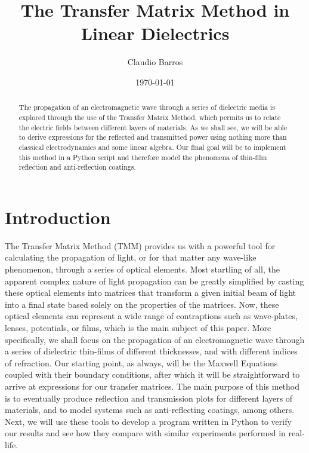 \documentclass[preprint, onecolumn, amsmath, amssymb, aps]{revtex4-1}
\numberwithin{equation}{section}
\begin{document}
	
\title{The Transfer Matrix Method in Linear Dielectrics} 
	
\author{Claudio Barros}
	
	
\date{\today}

\renewcommand{\abstractname}{\vspace{0\baselineskip}}
	
\begin{abstract}

The propagation of an electromagnetic wave through a series of dielectric media is explored through the use of the Transfer Matrix Method, which permits us to relate the electric fields between different layers of materials. As we shall see, we will be able to derive expressions for the reflected and transmitted power using nothing more than classical electrodynamics and some linear algebra. Our final goal will be to implement this method in a Python script and therefore model the phenomena of thin-film reflection and anti-reflection coatings.  

\end{abstract}
	
\maketitle
	
\section{Introduction}

The Transfer Matrix Method (TMM) provides us with a powerful tool for calculating the propagation of light, or for that matter any wave-like phenomenon, through a series of optical elements. Most startling of all, the apparent complex nature of light propagation can be greatly simplified by casting these optical elements into matrices that transform a given initial beam of light into a final state based solely on the properties of the matrices. Now, these optical elements can represent a wide range of contraptions such as wave-plates, lenses, potentials, or films, which is the main subject of this paper. More specifically, we shall focus on the propagation of an electromagnetic wave through a series of dielectric thin-films of different thicknesses, and with different indices of refraction. Our starting point, as always, will be the Maxwell Equations coupled with their boundary conditions, after which it will be straightforward to arrive at expressions for our transfer matrices. The main purpose of this method is to eventually produce reflection and transmission plots for different layers of materials, and to model systems such as anti-reflecting coatings, among others. Next, we will use these tools to develop a program written in Python to verify our results and see how they compare with similar experiments performed in real-life. 
\end{document}
